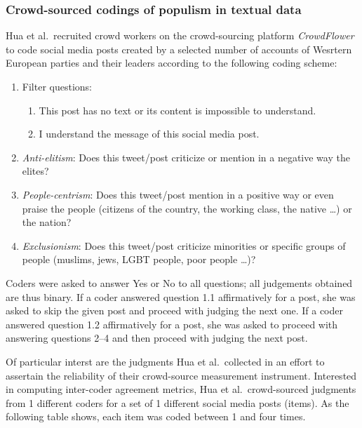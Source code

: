 \documentclass[]{article}
\providecommand{\tightlist}{%
  \setlength{\itemsep}{0pt}\setlength{\parskip}{0pt}}
\begin{document}
\hypertarget{crowd-sourced-codings-of-populism-in-textual-data}{%
\subsubsection{Crowd-sourced codings of populism in textual
data}\label{crowd-sourced-codings-of-populism-in-textual-data}}

Hua et al.~recruited crowd workers on the crowd-sourcing platform
\emph{CrowdFlower} to code social media posts created by a selected
number of accounts of Wesrtern European parties and their leaders
according to the following coding scheme:

\begin{enumerate}
\def\labelenumi{\arabic{enumi}.}
\tightlist
\item
  Filter questions:

  \begin{enumerate}
  \def\labelenumii{\arabic{enumii}.}
  \tightlist
  \item
    This post has no text or its content is impossible to understand.
  \item
    I understand the message of this social media post.
  \end{enumerate}
\item
  \emph{Anti-elitism}: Does this tweet/post criticize or mention in a
  negative way the elites?
\item
  \emph{People-centrism}: Does this tweet/post mention in a positive way
  or even praise the people (citizens of the country, the working class,
  the native \ldots) or the nation?
\item
  \emph{Exclusionism}: Does this tweet/post criticize minorities or
  specific groups of people (muslims, jews, LGBT people, poor people
  \ldots)?
\end{enumerate}

Coders were asked to answer Yes or No to all questions; all judgements
obtained are thus binary. If a coder answered question 1.1 affirmatively
for a post, she was asked to skip the given post and proceed with
judging the next one. If a coder answered question 1.2 affirmatively for
a post, she was asked to proceed with answering questions 2--4 and then
proceed with judging the next post.

Of particular interst are the judgments Hua et al.~collected in an
effort to assertain the reliability of their crowd-source measurement
instrument. Interested in computing inter-coder agreement metrics, Hua
et al.~crowd-sourced judgments from 1 different coders for a set of 1
different social media posts (items). As the following table shows, each
item was coded between 1 and four times.
\end{document}
